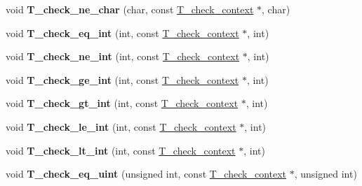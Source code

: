\begin{DoxyCompactItemize}
void {\bfseries T\+\_\+check\+\_\+ne\+\_\+char} (char, const \mbox{\hyperlink{structT__check__context}{T\+\_\+check\+\_\+context}} $\ast$, char)
\item 
\mbox{\label{group__RTEMSTestFrameworkImpl_gadfb32ef29feceafece6b0db1dec02e5e}} 
void {\bfseries T\+\_\+check\+\_\+eq\+\_\+int} (int, const \mbox{\hyperlink{structT__check__context}{T\+\_\+check\+\_\+context}} $\ast$, int)
\item 
\mbox{\label{group__RTEMSTestFrameworkImpl_ga5d7509d03082822a9609aff8aab476e6}} 
void {\bfseries T\+\_\+check\+\_\+ne\+\_\+int} (int, const \mbox{\hyperlink{structT__check__context}{T\+\_\+check\+\_\+context}} $\ast$, int)
\item 
\mbox{\label{group__RTEMSTestFrameworkImpl_ga9fb48043b3c0b07b7fba70b7ef8f32f1}} 
void {\bfseries T\+\_\+check\+\_\+ge\+\_\+int} (int, const \mbox{\hyperlink{structT__check__context}{T\+\_\+check\+\_\+context}} $\ast$, int)
\item 
\mbox{\label{group__RTEMSTestFrameworkImpl_gacc8e1d9dd5b55b67d5f6a61eacd09d24}} 
void {\bfseries T\+\_\+check\+\_\+gt\+\_\+int} (int, const \mbox{\hyperlink{structT__check__context}{T\+\_\+check\+\_\+context}} $\ast$, int)
\item 
\mbox{\label{group__RTEMSTestFrameworkImpl_ga46f5fb9ed5c2e3894990754644be9f12}} 
void {\bfseries T\+\_\+check\+\_\+le\+\_\+int} (int, const \mbox{\hyperlink{structT__check__context}{T\+\_\+check\+\_\+context}} $\ast$, int)
\item 
\mbox{\label{group__RTEMSTestFrameworkImpl_gacec91ba1e7f68d87e8a1171efd500ab4}} 
void {\bfseries T\+\_\+check\+\_\+lt\+\_\+int} (int, const \mbox{\hyperlink{structT__check__context}{T\+\_\+check\+\_\+context}} $\ast$, int)
\item 
\mbox{\label{group__RTEMSTestFrameworkImpl_gafc4b649e334d44f9a9acfd24cf4c779d}} 
void {\bfseries T\+\_\+check\+\_\+eq\+\_\+uint} (unsigned int, const \mbox{\hyperlink{structT__check__context}{T\+\_\+check\+\_\+context}} $\ast$, unsigned int)

\end{DoxyCompactItemize}
